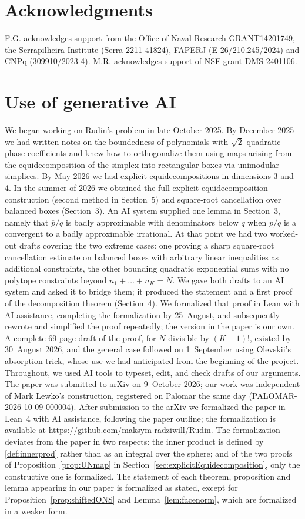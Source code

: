 \documentclass[a4paper,reqno,12pt]{amsart}
\theoremstyle{plain}
\theoremstyle{plain}
\theoremstyle{remark}
\theoremstyle{plain}
\theoremstyle{plain}
\theoremstyle{plain}
\begin{document}
{\section*{Acknowledgments}
F.G. acknowledges support from the Office of Naval Research
GRANT14201749, the Serrapilheira Institute
(Serra-2211-41824), FAPERJ (E-26/210.245/2024)
and CNPq (309910/2023-4). M.R. acknowledges support of NSF grant DMS-2401106.


\section*{Use of generative AI}
We began working on Rudin's problem in late October 2025. By December 2025 we
had written notes on the boundedness of polynomials with $\sqrt{2}$
quadratic-phase coefficients and knew how to orthogonalize them using
maps arising from the equidecomposition of the simplex into rectangular
boxes via unimodular simplices.
By May 2026 we had explicit equidecompositions in dimensions 3 and 4. In the
summer of 2026 we obtained the full explicit equidecomposition construction
(second method in Section~5) and square-root cancellation over balanced boxes
(Section~3). An AI system supplied one lemma in Section~3, namely that
$\overline{p}/q$ is badly approximable with denominators below $q$ when $p/q$
is a convergent to a badly approximable irrational. At that point we had two
worked-out drafts covering the two extreme cases: one proving a sharp
square-root cancellation estimate on balanced boxes with arbitrary linear
inequalities as additional constraints, the other bounding quadratic
exponential sums with no polytope constraints beyond $n_1+\dots+n_K=N$.
We gave both drafts to an AI system and asked it to bridge them; it produced
the statement and a first proof of the decomposition theorem (Section~4).
We formalized that proof in Lean with AI assistance, completing the
formalization by 25~August, and subsequently rewrote and simplified the
proof repeatedly; the version in the paper is our own. A complete 69-page
draft of the proof, for $N$ divisible by $(K-1)!$, existed by 30~August 2026,
and the general case followed on 1~September using Olevskii's absorption
trick, whose use we had anticipated from the beginning of the project.
Throughout, we used AI tools to typeset, edit, and check drafts of our
arguments. The paper was submitted to arXiv on 9~October 2026; our work was
independent of Mark Lewko's construction, registered on Palomar the same
day (PALOMAR-2026-10-09-000004). After submission to the arXiv we
formalized the paper in Lean~4 with AI assistance, following the paper
outline; the formalization is available at
\url{https://github.com/maksym-radziwill/Rudin}. The formalization
deviates from the paper in two respects: the inner product is defined by
\eqref{def:innerprod} rather than as an integral over the sphere; and of
the two proofs of Proposition~\ref{prop:UNmap} in
Section~\ref{sec:explicitEquidecomposition}, only the constructive one is
formalized. The statement of each theorem, proposition and lemma
appearing in our paper is formalized as stated, except for
Proposition~\ref{prop:shiftedONS} and
Lemma~\ref{lem:facenorm}, which are formalized in a weaker form.

}
\end{document}
